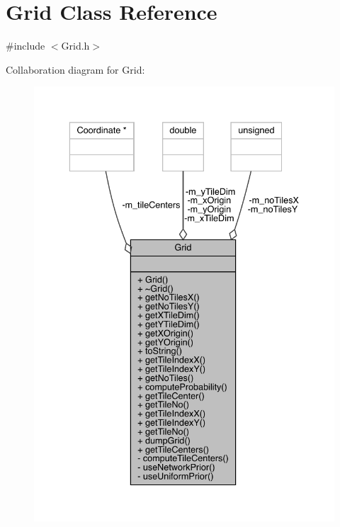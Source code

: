 \hypertarget{class_grid}{}\section{Grid Class Reference}
\label{class_grid}


{\ttfamily \#include $<$Grid.\+h$>$}



Collaboration diagram for Grid\+:
\nopagebreak
\begin{figure}[H]
\begin{center}
\leavevmode
\includegraphics[width=336pt]{class_grid__coll__graph}
\end{center}
\end{figure}
